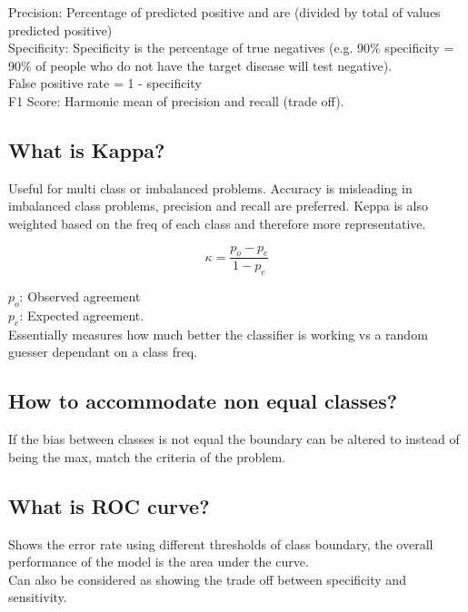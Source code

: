 \documentclass[11pt]{scrartcl} %
\begin{document}
Precision: Percentage of predicted positive and are (divided by total of values predicted positive)\\

Specificity: Specificity is the percentage of true negatives (e.g. 90\% specificity = 90\% of people who do not have the target disease will test negative).\\

False positive rate = 1 - specificity\\

F1 Score: Harmonic mean of precision and recall (trade off).

\subsection{What is Kappa?}

Useful for multi class or imbalanced problems. Accuracy is misleading in imbalanced class problems, precision and
recall are preferred. Keppa is also weighted based on the freq of each class and therefore more representative.

\begin{equation}
	\kappa = \frac{p_o - p_e}{1 - p_e}
\end{equation}

$p_o$: Observed agreement\\
$p_e$: Expected agreement.\\

Essentially measures how much better the classifier is working vs a random guesser dependant on a class freq.

\subsection{How to accommodate non equal classes?}

If the bias between classes is not equal the boundary can be altered to instead of being the max,
match the criteria of the problem.

\subsection{What is ROC curve?}

Shows the error rate using different thresholds of class boundary, the overall performance of the model is the
area under the curve.\\

Can also be considered as showing the trade off between specificity and sensitivity.\\
\end{document}
